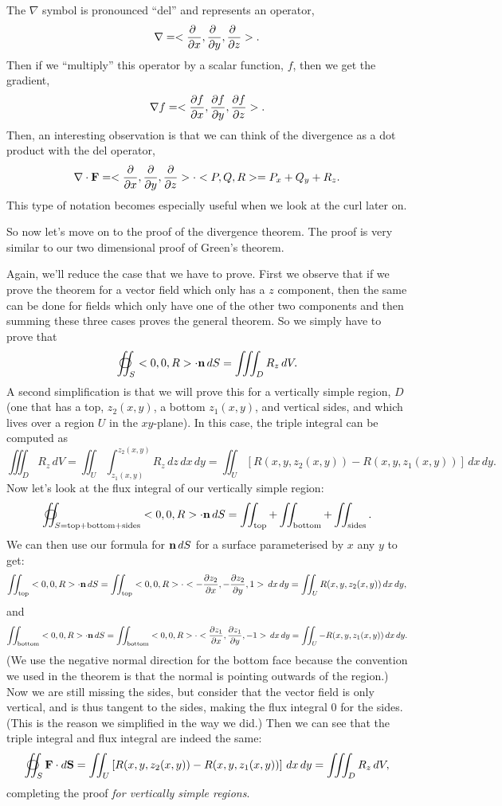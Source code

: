 \brm
The $\nabla$ symbol is pronounced ``del'' and represents an operator,
\[ \nabla = <\pd{\ }{x},\pd{\ }{y},\pd{\ }{z}>. \]
Then if we ``multiply'' this operator by a scalar function, $f$, then we get the gradient,
\[ \nabla f = <\frac{\partial f}{\partial x},\frac{\partial f}{\partial y},\frac{\partial f}{\partial z}>. \]
Then, an interesting observation is that we can think of the divergence as a dot product with the del operator,
\[ \nabla \cdot \boldsymbol{\mathbf{F}} = <\frac{\partial }{\partial x},\frac{\partial }{\partial y},\frac{\partial }{\partial z}> \cdot <P,Q,R> = P_x + Q_y + R_z. \]
This type of notation becomes especially useful when we look at the curl later on.
\erm

So now let's move on to the proof of the divergence theorem. The proof is very similar to our two dimensional proof of Green's theorem.

Again, we'll reduce the case that we have to prove. First we observe that if we prove the theorem for a vector field which only has a $z$ component, then the same can be done for fields which only have one of the other two components and then summing these three cases proves the general theorem. So we simply have to prove that
\[ \oiint_S <0,0,R>\cdot \vn\,dS = \iiint_D R_z \, dV. \]
A second simplification is that we will prove this for a vertically simple region, $D$ (one that has a top, $z_2(x,y)$, a bottom $z_1(x,y)$, and vertical sides, and which lives over a region $U$ in the $xy$-plane). In this case, the triple integral can be computed as
\[ \iiint_D R_z \, dV = \iint_U \int_{z_1(x,y)}^{z_2(x,y)} R_z\,dz\,dx\,dy = \iint_U \left[ R(x,y,z_2(x,y)) - R(x,y,z_1(x,y)) \right]\,dx\,dy. \]
Now let's look at the flux integral of our vertically simple region:
\[ \oiint_{S=\mathrm{top+bottom+sides}} <0,0,R> \cdot \vn \, dS = \iint_{\mathrm{top}} + \iint_{\mathrm{bottom}} + \iint_{\mathrm{sides}}.\]
We can then use our formula for $\boldsymbol{\mathbf{n}}\,dS$ for a surface parameterised by $x$ any $y$ to get:
\[ \iint_{\mathrm{top}} <0,0,R> \cdot \boldsymbol{\mathbf{n}} \, dS = \iint_{\mathrm{top}} <0,0,R> \cdot <-\frac{\partial z_2}{\partial x},-\frac{\partial z_2}{\partial y},1> \,dx\,dy = \iint_U R(x,y,z_2(x,y))\,dx\,dy, \]
and
\[ \iint_{\mathrm{bottom}} <0,0,R> \cdot \boldsymbol{\mathbf{n}} \, dS = \iint_{\mathrm{bottom}} <0,0,R> \cdot <\frac{\partial z_1}{\partial x},\frac{\partial z_1}{\partial y},-1> \,dx\,dy = \iint_U -R(x,y,z_1(x,y))\,dx\,dy. \]
(We use the negative normal direction for the bottom face because the convention we used in the theorem is that the normal is pointing outwards of the region.) Now we are still missing the sides, but consider that the vector field is only vertical, and is thus tangent to the sides, making the flux integral 0 for the sides. (This is the reason we simplified in the way we did.) Then we can see that the triple integral and flux integral are indeed the same:
\[ \oiint_S \vF \cdot \vdS = \iint_U \left[ R(x,y,z_2(x,y)) - R(x,y,z_1(x,y)) \right]\,dx\,dy = \iiint_D R_z \, dV, \]
completing the proof \textit{for vertically simple regions}.

